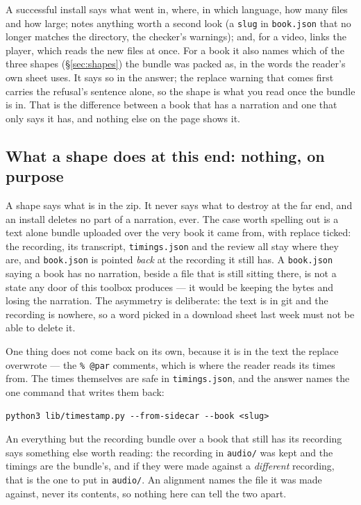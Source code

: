 \documentclass[11pt,oneside]{report}
\newcommand{\file}[1]{\texttt{#1}}
\newcommand{\menu}[1]{\textsf{#1}}
\begin{document}
A successful install says what went in, where, in which language, how many
files and how large; notes anything worth a second look (a \texttt{slug} in
\file{book.json} that no longer matches the directory, the checker's
warnings); and, for a video, links the player, which reads the new files at
once. For a book it also names which of the three shapes
(\S\ref{sec:shapes}) the bundle was packed as, in the words the reader's own
sheet uses. It says so in the answer; the \menu{replace} warning that comes
first carries the refusal's sentence alone, so the shape is what you read
once the bundle is in.
That is the difference between a book that has a narration and one that only
says it has, and nothing else on the page shows it.

\subsection*{What a shape does at this end: nothing, on purpose}

A shape says what is in the zip. It never says what to destroy at the far
end, and an install deletes no part of a narration, ever. The case worth
spelling out is a \menu{text alone} bundle uploaded over the very book it
came from, with \menu{replace} ticked: the recording, its transcript,
\file{timings.json} and the review all stay where they are, and
\file{book.json} is pointed \emph{back} at the recording it still has. A
\file{book.json} saying a book has no narration, beside a file that is still
sitting there, is not a state any door of this toolbox produces --- it would
be keeping the bytes and losing the narration. The asymmetry is deliberate:
the text is in git and the recording is nowhere, so a word picked in a
download sheet last week must not be able to delete it.

One thing does not come back on its own, because it is in the text the
replace overwrote --- the \verb|% @par| comments, which is where the reader
reads its times from. The times themselves are safe in \file{timings.json},
and the answer names the one command that writes them back:

\begin{lstlisting}
python3 lib/timestamp.py --from-sidecar --book <slug>
\end{lstlisting}

\noindent An \menu{everything but the recording} bundle over a book that
still has its recording says something else worth reading: the recording in
\file{audio/} was kept and the timings are the bundle's, and if they were
made against a \emph{different} recording, that is the one to put in
\file{audio/}. An alignment names the file it was made against, never its
contents, so nothing here can tell the two apart.
\end{document}
